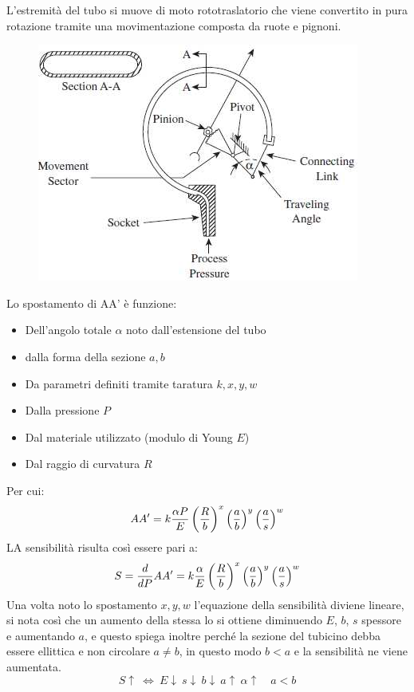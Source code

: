 \documentclass[a4paper, 15pt]{article}
\begin{document}
\begin{adjustwidth}{2in}{}
  		 L'estremità del tubo si muove di moto rototraslatorio che viene convertito in pura rotazione tramite una movimentazione composta da ruote e pignoni.   		
  		\begin{figure}[H]
  			\centering
  			\includegraphics[width=0.5\linewidth]{immagini/manometro1}
  			\label{fig:manometro1}
  		\end{figure}
  	  		Lo spostamento di AA' è funzione:
  		\begin{itemize}
  			\item Dell'angolo totale $\alpha$ noto dall'estensione del tubo
  			\item dalla forma della sezione $a, b$ 
  			\item Da parametri definiti tramite taratura $k, x, y, w$
  			\item Dalla pressione $P$
  			\item Dal materiale utilizzato (modulo di Young $E$)
  			\item Dal raggio di curvatura $R$
  		\end{itemize}
  		Per cui:
  		\[AA' = k{\alpha P\over E}\left(R\over b\right)^x\left(a\over b\right)^y\left(a\over s\right)^w\]
  		LA sensibilità risulta così essere pari a:
  		\[ S = {d\over dP}AA' = k{\alpha\over E}\left(R\over b\right)^x\left(a\over b\right)^y\left(a\over s\right)^w \]
  		Una volta noto lo spostamento $x, y, w$ l'equazione della sensibilità diviene lineare, si nota così che un aumento della stessa lo si ottiene diminuendo $E$, $b$, $s$ spessore e aumentando $a$, e questo spiega inoltre perché la sezione del tubicino debba essere ellittica e non circolare $a\ne b$, in questo modo $b<a$ e la sensibilità ne viene aumentata. 
  		\[S\uparrow~\Leftrightarrow ~ E\downarrow~s\downarrow~b\downarrow~a\uparrow~\alpha\uparrow\quad a<b\]
  		

\end{adjustwidth}
\end{document}
